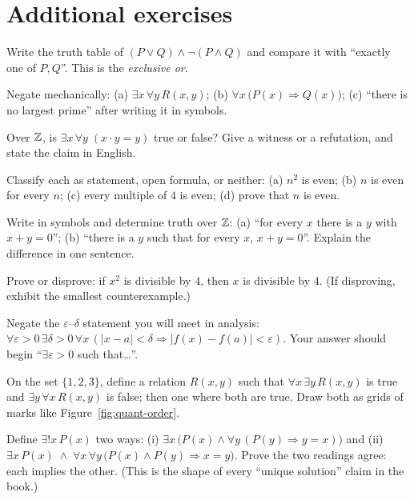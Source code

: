 \section{Additional exercises}
\begin{exercise}[easy]
Write the truth table of $(P \lor Q) \land \lnot(P \land Q)$ and compare it with
``exactly one of $P,Q$''. This is the \emph{exclusive or}.
\end{exercise}
\begin{exercise}[easy]
Negate mechanically: (a) $\exists x\,\forall y\,R(x,y)$;
(b) $\forall x\,\bigl(P(x)\Rightarrow Q(x)\bigr)$;
(c) ``there is no largest prime'' after writing it in symbols.
\end{exercise}
\begin{exercise}[easy]
Over $\mathbb{Z}$, is $\exists x\,\forall y\;(x\cdot y = y)$ true or false? Give a witness
or a refutation, and state the claim in English.
\end{exercise}
\begin{exercise}[easy]
Classify each as statement, open formula, or neither: (a) $n^2$ is even;
(b) $n$ is even for every $n$; (c) every multiple of $4$ is even; (d) prove that
$n$ is even.
\end{exercise}
\begin{exercise}[medium]
Write in symbols and determine truth over $\mathbb{Z}$: (a) ``for every $x$ there is a $y$
with $x+y=0$''; (b) ``there is a $y$ such that for every $x$, $x+y=0$''.
Explain the difference in one sentence.
\end{exercise}
\begin{exercise}[medium]
Prove or disprove: if $x^2$ is divisible by $4$, then $x$ is divisible by $4$.
(If disproving, exhibit the smallest counterexample.)
\end{exercise}
\begin{exercise}[medium]
Negate the $\varepsilon$--$\delta$ statement you will meet in analysis:
$\forall \varepsilon>0\,\exists\delta>0\,\forall x\,
(|x-a|<\delta \Rightarrow |f(x)-f(a)|<\varepsilon)$.
Your answer should begin ``$\exists \varepsilon>0$ such that\dots''.
\end{exercise}
\begin{exercise}[medium]
On the set $\{1,2,3\}$, define a relation $R(x,y)$ such that
$\forall x\,\exists y\,R(x,y)$ is true and $\exists y\,\forall x\,R(x,y)$ is false;
then one where both are true. Draw both as grids of marks like
Figure~\ref{fig:quant-order}.
\end{exercise}
\begin{exercise}[hard]
Define $\exists!x\,P(x)$ two ways: (i) $\exists x\,\bigl(P(x)\land \forall y\,
(P(y)\Rightarrow y=x)\bigr)$ and (ii) $\exists x\,P(x)\;\land\;\forall x\,\forall y\,
\bigl(P(x)\land P(y) \Rightarrow x=y\bigr)$. Prove the two readings agree: each
implies the other. (This is the shape of every ``unique solution'' claim in the
book.)
\end{exercise}
